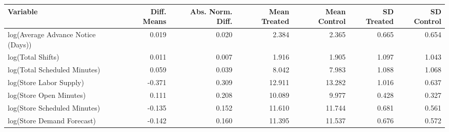\begingroup\scriptsize
\begin{tabular}{lrrrrrr}
  \toprule
Variable & Diff. Means & Abs. Norm. Diff. & Mean Treated & Mean Control & SD Treated & SD Control \\ 
  \midrule
log(Average Advance Notice (Days)) & 0.019 & 0.020 & 2.384 & 2.365 & 0.665 & 0.654 \\ 
  log(Total Shifts) & 0.011 & 0.007 & 1.916 & 1.905 & 1.097 & 1.043 \\ 
  log(Total Scheduled Minutes) & 0.059 & 0.039 & 8.042 & 7.983 & 1.088 & 1.068 \\ 
  log(Store Labor Supply) & -0.371 & 0.309 & 12.911 & 13.282 & 1.016 & 0.637 \\ 
  log(Store Open Minutes) & 0.111 & 0.208 & 10.089 & 9.977 & 0.428 & 0.327 \\ 
  log(Store Scheduled Minutes) & -0.135 & 0.152 & 11.610 & 11.744 & 0.681 & 0.561 \\ 
  log(Store Demand Forecast) & -0.142 & 0.160 & 11.395 & 11.537 & 0.676 & 0.572 \\ 
   \bottomrule
\end{tabular}
\endgroup